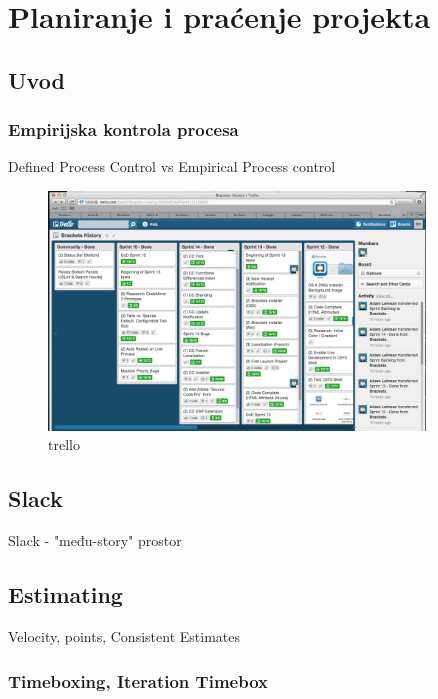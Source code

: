 \documentclass[lmodern, utf8, zavrsni]{fit}
\begin{document}
\chapter{Planiranje i praćenje projekta}
\vspace*{-0.7cm}

\section{Uvod}
\subsection{Empirijska kontrola procesa}

Defined Process Control vs Empirical Process control\citep{agiletransition}


\begin{figure}[H]
\centering
\includegraphics[width=10cm]{img/brackets_trello_sprint_history.png}
\caption{trello}
\end{figure}

\section{Slack}

Slack - "među-story" prostor\citep[str. 275]{agileart}

\section{Estimating}

Velocity, points,  Consistent Estimates

\subsection{Timeboxing, Iteration Timebox}
\end{document}
